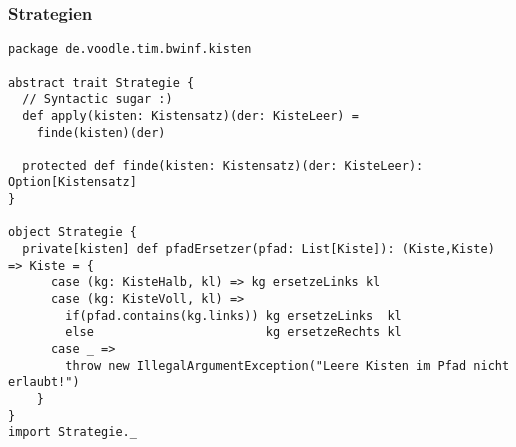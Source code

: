 \clearpage
\subsubsection{Strategien}

\begin{lstlisting}
package de.voodle.tim.bwinf.kisten

abstract trait Strategie {
  // Syntactic sugar :)
  def apply(kisten: Kistensatz)(der: KisteLeer) =
    finde(kisten)(der)

  protected def finde(kisten: Kistensatz)(der: KisteLeer): Option[Kistensatz]
}

object Strategie {
  private[kisten] def pfadErsetzer(pfad: List[Kiste]): (Kiste,Kiste) => Kiste = {
      case (kg: KisteHalb, kl) => kg ersetzeLinks kl
      case (kg: KisteVoll, kl) =>
        if(pfad.contains(kg.links)) kg ersetzeLinks  kl
        else                        kg ersetzeRechts kl
      case _ =>
        throw new IllegalArgumentException("Leere Kisten im Pfad nicht erlaubt!")
    }
}
import Strategie._


\end{lstlisting}
